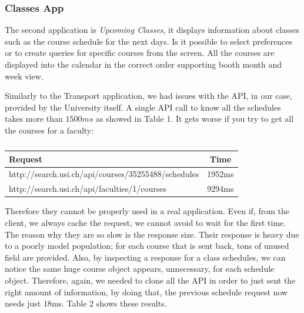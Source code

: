 \documentclass[]{usiinfbachelorproject}
\begin{document}
\subsubsection{Classes App}
The second application is \emph{Upcoming Classes}, it displays information about classes such as the course schedule for the next days. Is it possible to select preferences or to create queries for specific courses from the screen. All the courses are displayed into the calendar in the correct order supporting booth month and week view.

Similarly to the Transport application, we had issues with the API, in our case, provided by the University itself.
A single API call to know all the schedules takes more than $1500ms$ as showed in Table 1. It gets worse if you try to get all the courses for a faculty:
\begin{table}[h]
\centering
\begin{tabular}{|l|c|}
\hline
Request & Time \\\hline
http://search.usi.ch/api/courses/35255488/schedules & 1952ms \\
http://search.usi.ch/api/faculties/1/courses & 9294ms\\\hline
\end{tabular}
\caption{}
\label{table:usi_request}
\end{table}

Therefore they cannot be properly used in a real application. Even if, from the client, we always cache the request, we cannot avoid to wait for the first time. The reason why they are so slow is the response size. Their response is heavy due to a poorly model population; for each course that is sent back, tons of unused field are provided. Also, by inspecting a response for a class schedules, we can notice the same huge course object appears, unnecessary, for each schedule object.
Therefore, again, we needed to clone all the API in order to just sent the right amount of information, by doing that, the previous schedule request now needs just $18$ms. Table 2 shows these results.
\end{document}
